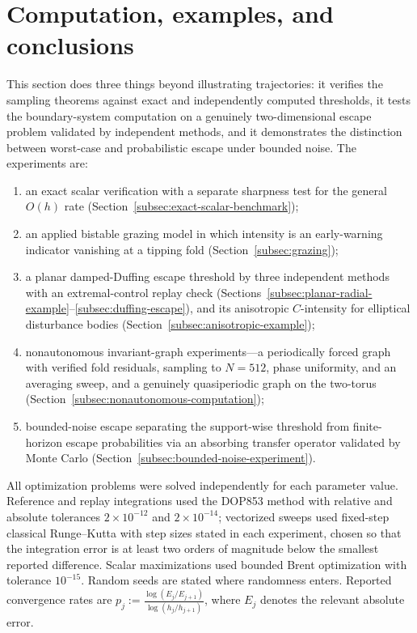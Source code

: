 \documentclass[pdflatex,sn-mathphys-num]{sn-jnl}
\numberwithin{equation}{section}
\theoremstyle{thmstyleone}%
\theoremstyle{definition}
\theoremstyle{remark}
\begin{document}
\section{Computation, examples, and conclusions}
\label{sec:examples}

This section does three things beyond illustrating trajectories: it verifies the sampling theorems against exact and independently computed thresholds, it tests the boundary-system computation on a genuinely
two-dimensional escape problem validated by independent methods, and it demonstrates the distinction between worst-case and probabilistic escape under bounded noise. The experiments are:
\begin{enumerate}
    \item an exact scalar verification with a separate sharpness test for the general $O(h)$ rate (Section~\ref{subsec:exact-scalar-benchmark});
    \item an applied bistable grazing model in which intensity is an early-warning indicator vanishing at a tipping fold (Section~\ref{subsec:grazing});
    \item a planar damped-Duffing escape threshold by three independent methods with an extremal-control replay check (Sections~\ref{subsec:planar-radial-example}--\ref{subsec:duffing-escape}), and its anisotropic $C$-intensity for elliptical disturbance bodies (Section~\ref{subsec:anisotropic-example});
    \item nonautonomous invariant-graph experiments---a periodically forced graph with verified fold residuals, sampling to $N=512$, phase uniformity, and an averaging sweep, and a genuinely quasiperiodic graph on the two-torus (Section~\ref{subsec:nonautonomous-computation});
    \item bounded-noise escape separating the support-wise threshold from finite-horizon escape probabilities via an absorbing transfer operator validated by Monte Carlo (Section~\ref{subsec:bounded-noise-experiment}).
\end{enumerate}

All optimization problems were solved independently for each parameter value. Reference and replay integrations used the DOP853 method with relative and absolute tolerances $2\times10^{-12}$ and $2\times10^{-14}$; vectorized sweeps used fixed-step classical Runge--Kutta with step sizes stated in each experiment, chosen so that the integration error is at least two orders of magnitude below the smallest reported difference. Scalar maximizations used bounded Brent optimization with tolerance $10^{-15}$. Random seeds are stated where randomness enters. Reported convergence rates are $p_j := \frac{\log(E_j/E_{j+1})}{\log(h_j/h_{j+1})}$, where $E_j$ denotes the relevant absolute error.
\end{document}
